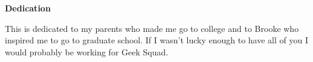 {}
\begin{doublespace}
  \begin{center}
    \textbf{Dedication}
  \end{center}
This is dedicated to my parents who made me go to college and to Brooke who inspired me to go to graduate school.  If I wasn't lucky enough to have all of you I would probably be working for Geek Squad.
\end{doublespace}